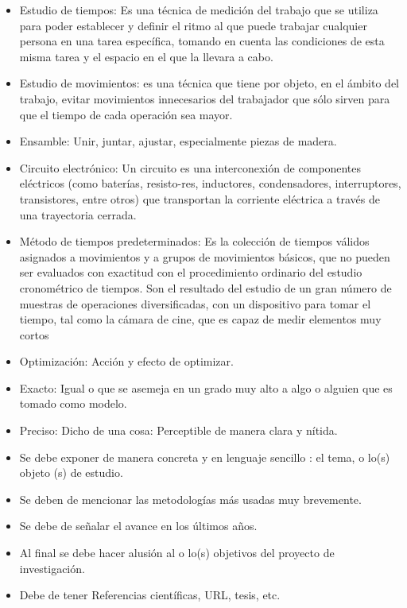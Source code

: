     \begin{itemize}
        \item Estudio de tiempos: Es una técnica de medición del trabajo que se utiliza para poder establecer y definir el ritmo al que puede trabajar cualquier persona en una tarea específica, tomando en cuenta las condiciones de esta misma tarea y el espacio en el que la llevara a cabo. \cite{Estudiodetiempos}
        \item Estudio de movimientos: es una técnica que tiene por objeto, en el ámbito del trabajo, evitar movimientos innecesarios del trabajador que sólo sirven para que el tiempo de cada operación sea mayor.\cite{Estudiodemovimientos}
        \item Ensamble: Unir, juntar, ajustar, especialmente piezas de madera.\cite{Ensamble} 
        \item Circuito electrónico: Un circuito es una interconexión de componentes eléctricos (como baterías, resisto-res, inductores, condensadores, interruptores, transistores, entre otros) que transportan la corriente eléctrica a través de una trayectoria cerrada.\cite{Circuitoelectrico} 
        \item Método de tiempos predeterminados: Es la colección de tiempos válidos asignados a movimientos y a grupos de movimientos básicos, que no pueden ser evaluados con exactitud con el procedimiento ordinario del estudio cronométrico de tiempos. Son el resultado del estudio de un gran número de muestras de operaciones diversificadas, con un dispositivo para tomar el tiempo, tal como la cámara de cine, que es capaz de medir elementos muy cortos 
        \cite{Tiempospredeterminados}
        \item Optimización: Acción y efecto de optimizar. \cite{optimizacion}
         \item Exacto: Igual o que se asemeja en un grado muy alto a algo o alguien que es tomado como modelo. \cite{Exacto}
        \item Preciso: Dicho de una cosa: Perceptible de manera clara y nítida.
    \end{itemize}
    \begin{itemize}
        \item Se debe exponer de manera concreta y en lenguaje sencillo : el tema, o lo(s) objeto (s) de estudio. 
        \item Se deben de mencionar las metodologías más usadas muy brevemente. 
        \item Se debe de señalar el avance en los últimos años.
        \item Al final se debe hacer alusión al o lo(s) objetivos del proyecto de investigación.
        \item Debe de tener Referencias científicas, URL, tesis, etc.
    \end{itemize}
